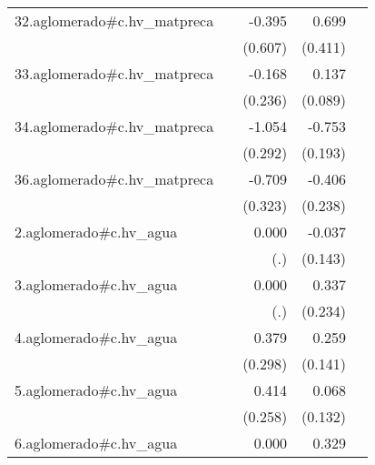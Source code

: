 {\begin{longtable}{l*{4}{D{.}{.}{-1}}}
\addlinespace
32.aglomerado#c.hv\_matpreca&                     &      -0.395         &       0.699         &                     \\
            &                     &     (0.607)         &     (0.411)         &                     \\
\addlinespace
33.aglomerado#c.hv\_matpreca&                     &      -0.168         &       0.137         &                     \\
            &                     &     (0.236)         &     (0.089)         &                     \\
\addlinespace
34.aglomerado#c.hv\_matpreca&                     &      -1.054\sym{***}&      -0.753\sym{***}&                     \\
            &                     &     (0.292)         &     (0.193)         &                     \\
\addlinespace
36.aglomerado#c.hv\_matpreca&                     &      -0.709\sym{*}  &      -0.406         &                     \\
            &                     &     (0.323)         &     (0.238)         &                     \\
\addlinespace
2.aglomerado#c.hv\_agua&                     &       0.000         &      -0.037         &                     \\
            &                     &         (.)         &     (0.143)         &                     \\
\addlinespace
3.aglomerado#c.hv\_agua&                     &       0.000         &       0.337         &                     \\
            &                     &         (.)         &     (0.234)         &                     \\
\addlinespace
4.aglomerado#c.hv\_agua&                     &       0.379         &       0.259         &                     \\
            &                     &     (0.298)         &     (0.141)         &                     \\
\addlinespace
5.aglomerado#c.hv\_agua&                     &       0.414         &       0.068         &                     \\
            &                     &     (0.258)         &     (0.132)         &                     \\
\addlinespace
6.aglomerado#c.hv\_agua&                     &       0.000         &       0.329         &                     \\

\end{longtable}}
